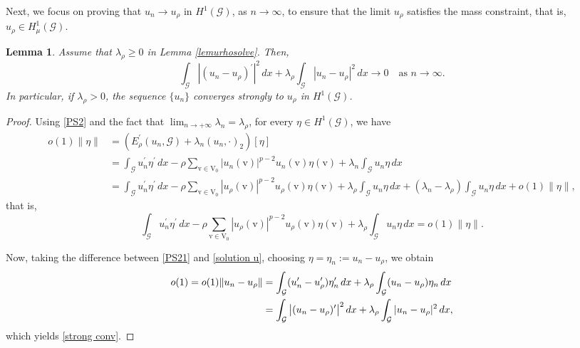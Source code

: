 \documentclass[11pt]{amsart}
\newtheorem{lemma}[theorem]{Lemma}
\newcommand{\G}{\mathcal{G}}
\newcommand{\V}{\mathrm{V}}
\newcommand{\vv}{\mathrm{v}}
\numberwithin{equation}{section}
\begin{document}
Next, we focus on proving that $u_{n} \to u_\rho$ in $H^1(\G)$, as $n \to \infty$, to ensure that the limit \(u_\rho\) satisfies the mass constraint, that is, \(u_\rho\in H^1_\mu(\mathcal{G})\).

\begin{lemma}\label{lemurhoconverge}
 Assume that $\lambda_\rho \geq 0$ in  Lemma \ref{lemurhosolve}. Then,
\begin{equation}\label{strong conv}
\int_{\mathcal{G}}|(u_{n}-u_{\rho})^{\prime}|^{2}\,dx+\lambda_{\rho}\int_{\mathcal{G}}|u_{n}-u_{\rho}|^{2}\,dx\to 0 \quad \text{as }n \to \infty.
\end{equation}
In particular, if \(\lambda_{\rho}>0\), the sequence \(\{u_{n}\}\) converges strongly to $u_{\rho}$ in \(H^{1}(\mathcal{G})\).
\end{lemma}

\begin{proof}
Using \eqref{PS2} and the fact that $\displaystyle\lim_{n \to +\infty} \lambda_n = \lambda_\rho$, for every \(\eta\in H^{1}(\mathcal{G})\), we have
\begin{align*}
o(1)\|\eta\|&=\left(E^{ \prime}_{\rho}(u_{n},\mathcal{G})+\lambda_{n}(u_{n},\cdot)_2\right)[\eta]\\
&= \int_{\mathcal{G}}u_{n}^{\prime}\eta^{\prime}\,dx-\rho\sum_{\vv\in \V_0}|u_n(\vv)|^{p-2}u_n(\vv)\eta(\vv)+\lambda_{n}\int_{\mathcal{G}}u_{n}\eta\,dx\\
&=\int_{\mathcal{G}}u_{n}^{\prime}\eta^{\prime}\,dx-\rho\sum_{\vv\in \V_0}|u_{\rho}(\vv)|^{p-2}u_{\rho}(\vv)\eta(\vv)+\lambda_{\rho}\int_{\mathcal{G}}u_{n}\eta\,dx+(\lambda_{n}-\lambda_{\rho})\int_{\mathcal{G}}u_{n}\eta\,dx+o(1)\|\eta\|,
\end{align*}
that is,
\begin{equation}\label{PS21}
\int_{\mathcal{G}}u_{n}^{\prime}\eta^{\prime}\,dx-\rho\sum_{\vv\in \V_0}|u_{\rho}(\vv)|^{p-2}u_{\rho}(\vv)\eta(\vv)+\lambda_{\rho}\int_{\mathcal{G}}u_{n}\eta\,dx=o(1)\|\eta\|.
\end{equation}

Now, taking the difference between \eqref{PS21} and \eqref{solution u}, choosing \(\eta=\eta_{n}:=u_{n}-u_{\rho}\), we obtain
\begin{align*}
o(1)=o(1)\|u_{n}-u_{\rho}\|
&=\int_{\mathcal{G}}(u_{n}^{\prime}-u_{\rho}^{\prime})\eta_{n}^{\prime}\,dx+\lambda_{\rho}\int_{\mathcal{G}}(u_{n}-u_{\rho})\eta_{n}\,dx\\
&=\int_{\mathcal{G}}\big{|}(u_{n}-u_{\rho})^{\prime}\big{|}^{2 }\,dx+\lambda_{\rho}\int_{\mathcal{G}}|u_{n}-u_{\rho}|^{2}\,dx,
\end{align*}
which yields \eqref{strong conv}.
\end{proof}
\end{document}
